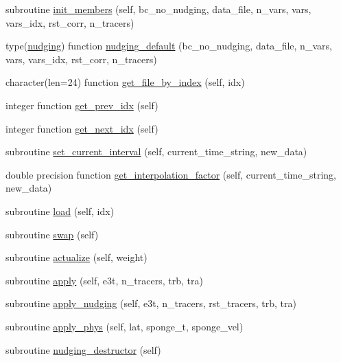 \begin{DoxyCompactItemize}
\item 
subroutine \mbox{\hyperlink{namespacenudging__mod_a396abff37a5fd2c555d5118b36e1e765}{init\+\_\+members}} (self, bc\+\_\+no\+\_\+nudging, data\+\_\+file, n\+\_\+vars, vars, vars\+\_\+idx, rst\+\_\+corr, n\+\_\+tracers)
\item 
type(\mbox{\hyperlink{structnudging__mod_1_1nudging}{nudging}}) function \mbox{\hyperlink{namespacenudging__mod_ab47a1ee2c4874bb8ed5ed05fc3d2fda1}{nudging\+\_\+default}} (bc\+\_\+no\+\_\+nudging, data\+\_\+file, n\+\_\+vars, vars, vars\+\_\+idx, rst\+\_\+corr, n\+\_\+tracers)
\item 
character(len=24) function \mbox{\hyperlink{namespacenudging__mod_a9c5140991fb8e1f77cd3c13a5f2afbeb}{get\+\_\+file\+\_\+by\+\_\+index}} (self, idx)
\item 
integer function \mbox{\hyperlink{namespacenudging__mod_a762a7889128eda49397f056becc83000}{get\+\_\+prev\+\_\+idx}} (self)
\item 
integer function \mbox{\hyperlink{namespacenudging__mod_a2a4e356c3d28fa6bcce757166a7bf377}{get\+\_\+next\+\_\+idx}} (self)
\item 
subroutine \mbox{\hyperlink{namespacenudging__mod_a2f7701af532e7c9624c52fb99fae1135}{set\+\_\+current\+\_\+interval}} (self, current\+\_\+time\+\_\+string, new\+\_\+data)
\item 
double precision function \mbox{\hyperlink{namespacenudging__mod_a9075b50dbf7142e7c28b779888383e5f}{get\+\_\+interpolation\+\_\+factor}} (self, current\+\_\+time\+\_\+string, new\+\_\+data)
\item 
subroutine \mbox{\hyperlink{namespacenudging__mod_a885c2883f43f1a6cf2aadd5765844aea}{load}} (self, idx)
\item 
subroutine \mbox{\hyperlink{namespacenudging__mod_a98e83d7bb41ed78b3aecc5191e9d4d6b}{swap}} (self)
\item 
subroutine \mbox{\hyperlink{namespacenudging__mod_a0fed21a76bcb2b1c360940bfbe8b68cf}{actualize}} (self, weight)
\item 
subroutine \mbox{\hyperlink{namespacenudging__mod_a1ebb358bce355373b850b0d16484c548}{apply}} (self, e3t, n\+\_\+tracers, trb, tra)
\item 
subroutine \mbox{\hyperlink{namespacenudging__mod_a57e5db057d271bd14f1b97070e0d9c41}{apply\+\_\+nudging}} (self, e3t, n\+\_\+tracers, rst\+\_\+tracers, trb, tra)
\item 
subroutine \mbox{\hyperlink{namespacenudging__mod_abf742a7b870eba708b8575f2e2df8159}{apply\+\_\+phys}} (self, lat, sponge\+\_\+t, sponge\+\_\+vel)
\item 
subroutine \mbox{\hyperlink{namespacenudging__mod_a207796b926c6a79ec210afdad26ac817}{nudging\+\_\+destructor}} (self)
\end{DoxyCompactItemize}


